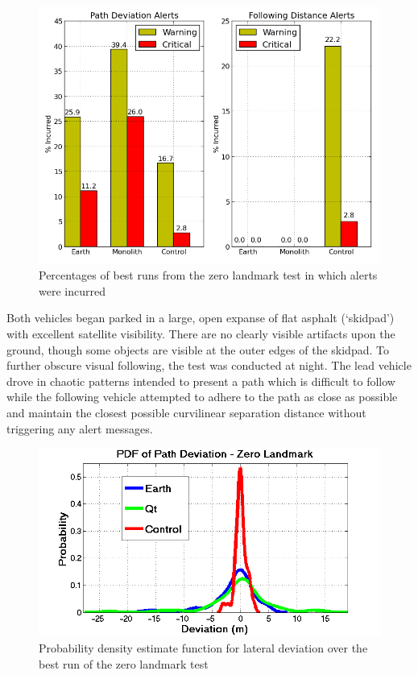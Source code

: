 \documentclass[twocolumn,10pt]{article}
\begin{document}
    \begin{figure}[ht] \centering
      \includegraphics[width=\columnwidth]{../graphics/zero_landmark_alert_percents.png}
      \caption{Percentages of best runs from the zero landmark test in which alerts were incurred}
      \label{fig:zero_landmark_alert_percents}
    \end{figure}

    Both vehicles began parked in a large, open expanse of flat asphalt (`skidpad') with excellent satellite visibility.  There are no clearly visible artifacts upon the ground, though some objects are visible at the outer edges of the skidpad.  To further obscure visual following, the test was conducted at night.  The lead vehicle drove in chaotic patterns intended to present a path which is difficult to follow while the following vehicle attempted to adhere to the path as close as possible and maintain the closest possible curvilinear separation distance without triggering any alert messages.

    \begin{figure}[ht] \centering
      \includegraphics[width=\columnwidth]{../graphics/pdf_zero_landmark_deviation.png}
      \caption{Probability density estimate function for lateral deviation over the best run of the zero landmark test}
      \label{fig:pdf_zl_dev}
    \end{figure}
\end{document}
